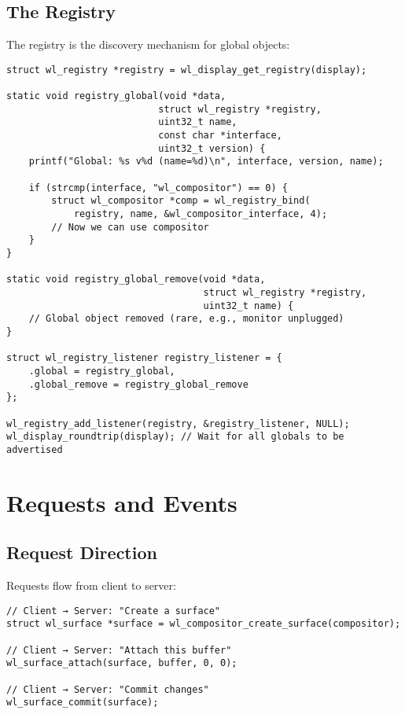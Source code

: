 \subsection{The Registry}

The registry is the discovery mechanism for global objects:

\begin{lstlisting}[style=cstyle, caption=Using the Registry]
struct wl_registry *registry = wl_display_get_registry(display);

static void registry_global(void *data,
                           struct wl_registry *registry,
                           uint32_t name,
                           const char *interface,
                           uint32_t version) {
    printf("Global: %s v%d (name=%d)\n", interface, version, name);

    if (strcmp(interface, "wl_compositor") == 0) {
        struct wl_compositor *comp = wl_registry_bind(
            registry, name, &wl_compositor_interface, 4);
        // Now we can use compositor
    }
}

static void registry_global_remove(void *data,
                                   struct wl_registry *registry,
                                   uint32_t name) {
    // Global object removed (rare, e.g., monitor unplugged)
}

struct wl_registry_listener registry_listener = {
    .global = registry_global,
    .global_remove = registry_global_remove
};

wl_registry_add_listener(registry, &registry_listener, NULL);
wl_display_roundtrip(display); // Wait for all globals to be advertised
\end{lstlisting}

\section{Requests and Events}

\subsection{Request Direction}

Requests flow from client to server:

\begin{lstlisting}[style=cstyle, caption=Client Requests]
// Client → Server: "Create a surface"
struct wl_surface *surface = wl_compositor_create_surface(compositor);

// Client → Server: "Attach this buffer"
wl_surface_attach(surface, buffer, 0, 0);

// Client → Server: "Commit changes"
wl_surface_commit(surface);
\end{lstlisting}


